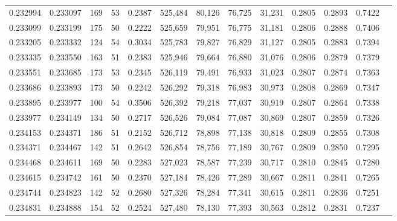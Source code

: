 \begin{tabular}{rrrrrrrrrrrrr}
0.232994 & 0.233097 &   169 &  53 &                                     0.2387 & 525,484 &  80,126 &  76,725 &  31,231 & 0.2805 & 0.2893 & 0.7422 \\
0.233099 & 0.233199 &   175 &  50 &                                     0.2222 & 525,659 &  79,951 &  76,775 &  31,181 & 0.2806 & 0.2888 & 0.7406 \\
0.233205 & 0.233332 &   124 &  54 &                                     0.3034 & 525,783 &  79,827 &  76,829 &  31,127 & 0.2805 & 0.2883 & 0.7394 \\
0.233335 & 0.233550 &   163 &  51 &                                     0.2383 & 525,946 &  79,664 &  76,880 &  31,076 & 0.2806 & 0.2879 & 0.7379 \\
0.233551 & 0.233685 &   173 &  53 &                                     0.2345 & 526,119 &  79,491 &  76,933 &  31,023 & 0.2807 & 0.2874 & 0.7363 \\
0.233686 & 0.233893 &   173 &  50 &                                     0.2242 & 526,292 &  79,318 &  76,983 &  30,973 & 0.2808 & 0.2869 & 0.7347 \\
0.233895 & 0.233977 &   100 &  54 &                                     0.3506 & 526,392 &  79,218 &  77,037 &  30,919 & 0.2807 & 0.2864 & 0.7338 \\
0.233977 & 0.234149 &   134 &  50 &                                     0.2717 & 526,526 &  79,084 &  77,087 &  30,869 & 0.2807 & 0.2859 & 0.7326 \\
0.234153 & 0.234371 &   186 &  51 &                                     0.2152 & 526,712 &  78,898 &  77,138 &  30,818 & 0.2809 & 0.2855 & 0.7308 \\
0.234371 & 0.234467 &   142 &  51 &                                     0.2642 & 526,854 &  78,756 &  77,189 &  30,767 & 0.2809 & 0.2850 & 0.7295 \\
0.234468 & 0.234611 &   169 &  50 &                                     0.2283 & 527,023 &  78,587 &  77,239 &  30,717 & 0.2810 & 0.2845 & 0.7280 \\
0.234615 & 0.234742 &   161 &  50 &                                     0.2370 & 527,184 &  78,426 &  77,289 &  30,667 & 0.2811 & 0.2841 & 0.7265 \\
0.234744 & 0.234823 &   142 &  52 &                                     0.2680 & 527,326 &  78,284 &  77,341 &  30,615 & 0.2811 & 0.2836 & 0.7251 \\
0.234831 & 0.234888 &   154 &  52 &                                     0.2524 & 527,480 &  78,130 &  77,393 &  30,563 & 0.2812 & 0.2831 & 0.7237 \\

\end{tabular}

